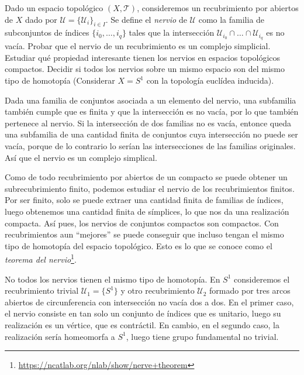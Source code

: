 \documentclass[twoside]{article}
\begin{document}
\begin{ejercicio}{1.9}
Dado un  espacio topológico $(X,\mathcal{T})$, consideremos un recubrimiento por abiertos de $X$ dado por $\mathcal{U} = \{\mathcal{U}_i\}_{i \in I}$.
Se define el \emph{nervio} de $\mathcal{U}$ como la familia de subconjuntos de índices $\{i_0,\dots,i_q\}$ tales que la intersección $\mathcal{U}_{i_0} \cap \dots \cap \mathcal{U}_{i_q}$ es no vacía.
Probar que el nervio de un recubrimiento es un complejo simplicial.
Estudiar qué propiedad interesante tienen los nervios en espacios topológicos compactos.
Decidir si todos los nervios sobre un mismo espacio son del mismo tipo de homotopía
(Considerar $X = S^1$ con la topología euclídea inducida).
\end{ejercicio}
\begin{solucion}
Dada una familia de conjuntos asociada a un elemento del nervio, una subfamilia también cumple que es finita y que la intersección es no vacía, por lo que también pertenece al nervio. Si la intersección de dos familias no es vacía, entonce queda una subfamilia de una cantidad finita de conjuntos cuya intersección no puede ser vacía, porque de lo contrario lo serían las intersecciones de las familias originales. Así que el nervio es un complejo simplical.

Como de todo recubrimiento por abiertos de un compacto se puede obtener un subrecubrimiento finito, podemos estudiar el nervio de los recubrimientos finitos. Por ser finito, solo se puede extraer una cantidad finita de familias de índices, luego obtenemos una cantidad finita de símplices, lo que nos da una realización compacta. Así pues, los nervios de conjuntos compactos son compactos. Con recubrimientos aun ``mejores'' se puede conseguir que incluso tengan el mismo tipo de homotopía del espacio topológico. Esto es lo que se conoce como el \emph{teorema del nervio}\footnote{\url{https://ncatlab.org/nlab/show/nerve+theorem}}.

No todos los nervios tienen el mismo tipo de homotopía. En $S^1$ consideremos el recubrimiento trivial $\mathcal{U}_1=\{S^1\}$ y otro recubrimiento $\mathcal{U}_2$ formado por tres arcos abiertos de circunferencia con intersección no vacía dos a dos. En el primer caso, el nervio consiste en tan solo un conjunto de índices que es unitario, luego su realización es un vértice, que es contráctil. En cambio, en el segundo caso, la realización sería homeomorfa a $S^1$, luego tiene grupo fundamental no trivial. 
\end{solucion}
\end{document}
